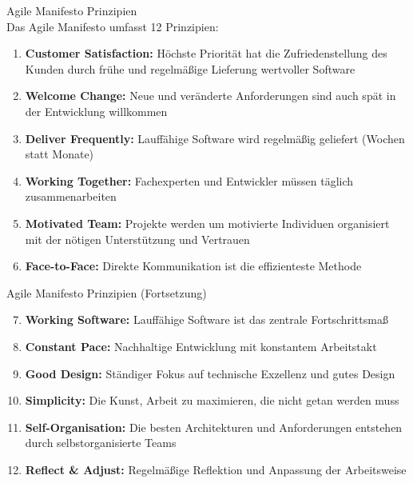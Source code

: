 \begin{definition}{Agile Manifesto Prinzipien}\\
    Das Agile Manifesto umfasst 12 Prinzipien:
    \begin{enumerate}
        \item \textbf{Customer Satisfaction:} Höchste Priorität hat die Zufriedenstellung des Kunden durch frühe und regelmäßige Lieferung wertvoller Software
        \item \textbf{Welcome Change:} Neue und veränderte Anforderungen sind auch spät in der Entwicklung willkommen
        \item \textbf{Deliver Frequently:} Lauffähige Software wird regelmäßig geliefert (Wochen statt Monate)
        \item \textbf{Working Together:} Fachexperten und Entwickler müssen täglich zusammenarbeiten
        \item \textbf{Motivated Team:} Projekte werden um motivierte Individuen organisiert mit der nötigen Unterstützung und Vertrauen
        \item \textbf{Face-to-Face:} Direkte Kommunikation ist die effizienteste Methode
    \end{enumerate}
\end{definition}

\begin{definition}{Agile Manifesto Prinzipien (Fortsetzung)}\\
    \begin{enumerate}
        \setcounter{enumi}{6}
        \item \textbf{Working Software:} Lauffähige Software ist das zentrale Fortschrittsmaß
        \item \textbf{Constant Pace:} Nachhaltige Entwicklung mit konstantem Arbeitstakt
        \item \textbf{Good Design:} Ständiger Fokus auf technische Exzellenz und gutes Design
        \item \textbf{Simplicity:} Die Kunst, Arbeit zu maximieren, die nicht getan werden muss
        \item \textbf{Self-Organisation:} Die besten Architekturen und Anforderungen entstehen durch selbstorganisierte Teams
        \item \textbf{Reflect \& Adjust:} Regelmäßige Reflektion und Anpassung der Arbeitsweise
    \end{enumerate}
\end{definition}

